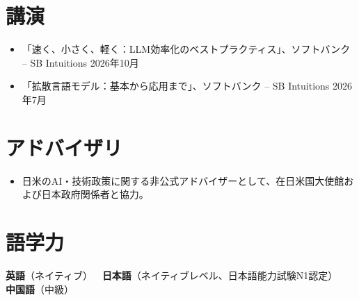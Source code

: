\documentclass[10pt,a4paper]{article}
\begin{document}
\section{講演}
\begin{itemize}[leftmargin=*, nosep, itemsep=3pt]
  \item 「速く、小さく、軽く：LLM効率化のベストプラクティス」、ソフトバンク -- SB Intuitions \hfill 2026年10月
  \item 「拡散言語モデル：基本から応用まで」、ソフトバンク -- SB Intuitions \hfill 2026年7月
\end{itemize}

\section{アドバイザリ}
\begin{itemize}[leftmargin=*, nosep, itemsep=3pt]
  \item 日米のAI・技術政策に関する非公式アドバイザーとして、在日米国大使館および日本政府関係者と協力。
\end{itemize}

\section{語学力}
\noindent\textbf{英語}（ネイティブ） \,\textperiodcentered\, \textbf{日本語}（ネイティブレベル、日本語能力試験N1認定） \,\textperiodcentered\, \textbf{中国語}（中級）
\end{document}

